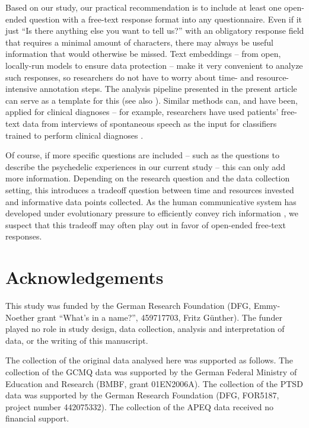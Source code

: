 \documentclass[man,floatsintext]{apa7}
\newcommand{\change}[1]{#1}
\begin{document}
Based on our study, our practical recommendation is to include at least one open-ended question with a free-text response format into any questionnaire. Even if it just ``Is there anything else you want to tell us?'' with an obligatory response field that requires a minimal amount of characters, there may always be useful information that would otherwise be missed. Text embeddings -- from open, locally-run models to ensure data protection -- make it very convenient to analyze such responses, so researchers do not have to worry about time- and resource-intensive annotation steps. The analysis pipeline presented in the present article can serve as a template for this (see also \cite{kjell2023text,debelak2025embeddings}). \change{Similar methods can, and have been, applied for clinical diagnoses -- for example, researchers have used patients' free-text data from interviews of spontaneous speech as the input for classifiers trained to perform clinical diagnoses \parencite{agbavor2022predicting,chen2025detecting,chen2026depression}. }

Of course, if more specific questions are included -- such as the questions to describe the psychedelic experiences in our current study -- this can only add more information. Depending on the research question and the data collection setting, this introduces a tradeoff question between time and resources invested and informative data points collected. As the human communicative system has developed under evolutionary pressure to efficiently convey rich information \parencite{gibson2019efficiency}, we suspect that this tradeoff may often play out in favor of open-ended free-text responses.

    

    

\section{Acknowledgements}

This study was funded by the German Research Foundation (DFG, Emmy-Noether grant ``What's in a name?'', 459717703, Fritz G\"unther). The funder played no role in study design, data collection, analysis and interpretation of data, or the writing of this manuscript.

The collection of the original data analysed here was supported as follows. The collection of the GCMQ data \parencite{wolff2024measuring} was supported by the German Federal Ministry of Education and Research (BMBF, grant 01EN2006A). The collection of the PTSD data \parencite{evens2026post} was supported by the German Research Foundation (DFG, FOR5187, project number 442075332). The collection of the APEQ data \parencite{wolff2022acceptance} received no financial support.
\end{document}
